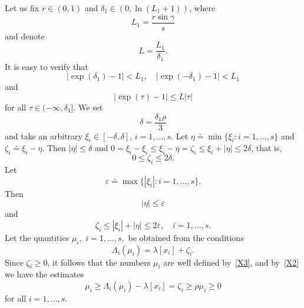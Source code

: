 \documentclass[10pt,a4paper]{amsart}
\theoremstyle{plain}
\begin{document}
Let us fix $r\in ( 0,1) $ and $\delta _{1}\in ( 0,\ln (
L_{1}+1) ) $, where%
\begin{equation*}
L_{1}=\frac{r\sin \gamma }{s}
\end{equation*}%
and denote%
\begin{equation*}
L=\frac{L_{1}}{\delta _{1}}.
\end{equation*}%
It is easy to verify that 
\begin{equation*}
\left| \exp ( \delta _{1}) -1\right| <L_{1},\quad
\left| \exp ( -\delta _{1}) -1\right| <L_{1}
\end{equation*}%
and 
\begin{equation*}
\left| \exp ( \tau ) -1\right| \le L\left| \tau
\right| 
\end{equation*}%
for all $\tau \in ( -\infty ,\delta _{1}] $. 
We set 
\begin{equation*}
\delta =\frac{\delta _{1}\rho }{3}
\end{equation*}%
and take an arbitrary $\xi_{i}\in [-\delta,\delta]$, $i=1,\dots,s$. 
Let $\eta\doteq\min\bigl\{\xi_i\colon i=1,\dots,s\bigr\}$ and $\zeta_i\doteq\xi_i-\eta$. Then
$|\eta|\le\delta$ and
$0=\xi_i-\xi_i\le\xi_i-\eta=\zeta_i\le\xi_i+|\eta|\le 2\delta$,
that is,
\begin{equation*}
0\le\zeta_i\le 2\delta.
\end{equation*}
Let
\begin{equation*}
\varepsilon \doteq\max \bigl\{|\xi_{i}| \colon i=1,\dots ,s\bigr\}.
\end{equation*}%
Then 
\begin{equation*}
|\eta| \le \varepsilon  
\label{X4}
\end{equation*}%
and%
\begin{equation*}
\zeta_i\le|\xi_i|+|\eta|\le 2\varepsilon,\quad i=1,\dots,s.   
\label{X5}
\end{equation*}%
Let the quantities $\mu _{i},$ $i=1,\dots ,s,$ be
obtained from the conditions 
\begin{equation*}
\Lambda _{i}(\mu _{i})=\lambda [ x_{i}] +\zeta _{i}.
\end{equation*}%
Since $\zeta_{i}\ge 0$, it follows that the numbers $\mu _{i}$ are well
defined by~\eqref{X3}, and by~\eqref{X2} we have the estimates 
\begin{equation*}
\mu _{i}\ge \Lambda _{i}(\mu _{i})-\lambda [ x_{i}] =\zeta_{i}\ge \rho \mu _{i}\ge 0
\end{equation*}%
for all $i=1,\dots ,s$.
\end{document}
